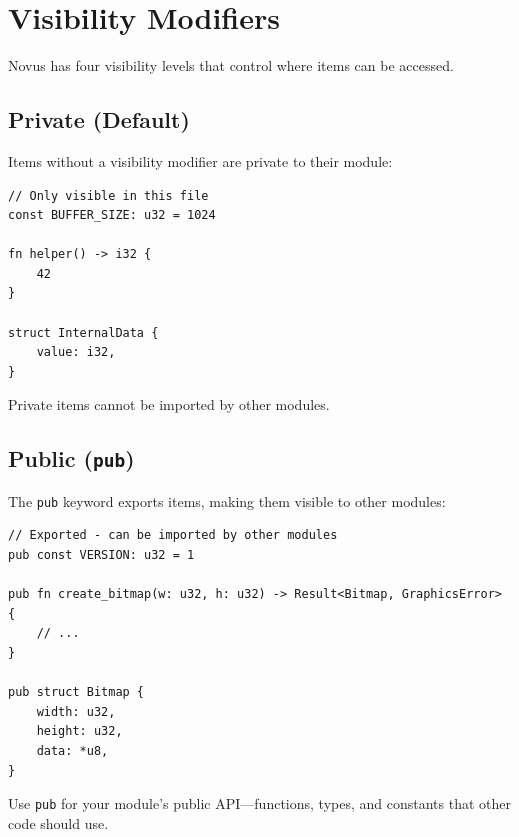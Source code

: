 \section{Visibility Modifiers}
\label{sec:module-visibility}

Novus has four visibility levels that control where items can be accessed.

\subsection{Private (Default)}
\label{subsec:private}

Items without a visibility modifier are private to their module:

\begin{lstlisting}
// Only visible in this file
const BUFFER_SIZE: u32 = 1024

fn helper() -> i32 {
    42
}

struct InternalData {
    value: i32,
}
\end{lstlisting}

Private items cannot be imported by other modules.

\subsection{Public (\texttt{pub})}
\label{subsec:public}

The \texttt{pub} keyword exports items, making them visible to other modules:

\begin{lstlisting}
// Exported - can be imported by other modules
pub const VERSION: u32 = 1

pub fn create_bitmap(w: u32, h: u32) -> Result<Bitmap, GraphicsError> {
    // ...
}

pub struct Bitmap {
    width: u32,
    height: u32,
    data: *u8,
}
\end{lstlisting}

Use \texttt{pub} for your module's public API---functions, types, and constants that other code should use.

